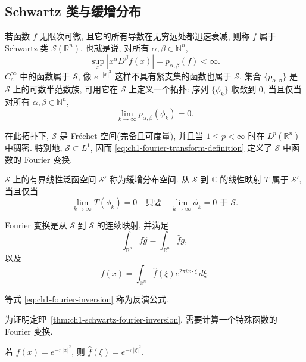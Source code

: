\subsection{Schwartz 类与缓增分布}
\label{sec:ch1-schwartz-tempered-distributions}

若函数 $f$ 无限次可微, 且它的所有导数在无穷远处都迅速衰减, 则称 $f$ 属于 Schwartz 类 $\mathcal S(\mathbb R^n)$. 也就是说, 对所有 $\alpha,\beta\in\mathbb N^n$,
\[
 \sup_x|x^\alpha D^\beta f(x)|=p_{\alpha,\beta}(f)<\infty.
\]
$C_c^\infty$ 中的函数属于 $\mathcal S$, 像 $e^{-|x|^2}$ 这样不具有紧支集的函数也属于 $\mathcal S$. 集合 $\{p_{\alpha,\beta}\}$ 是 $\mathcal S$ 上的可数半范数族, 可用它在 $\mathcal S$ 上定义一个拓扑: 序列 $\{\phi_k\}$ 收敛到 $0$, 当且仅当对所有 $\alpha,\beta\in\mathbb N^n$,
\[
 \lim_{k\to\infty}p_{\alpha,\beta}(\phi_k)=0.
\]

\hypertarget{chapter-01-page-025}{}
在此拓扑下, $\mathcal S$ 是 Fréchet 空间(完备且可度量), 并且当 $1\le p<\infty$ 时在 $L^p(\mathbb R^n)$ 中稠密. 特别地, $\mathcal S\subset L^1$, 因而 \eqref{eq:ch1-fourier-transform-definition} 定义了 $\mathcal S$ 中函数的 Fourier 变换.

$\mathcal S$ 上的有界线性泛函空间 $\mathcal S'$ 称为缓增分布空间. 从 $\mathcal S$ 到 $\mathbb C$ 的线性映射 $T$ 属于 $\mathcal S'$, 当且仅当
\[
 \lim_{k\to\infty}T(\phi_k)=0
 \quad\text{只要}\quad
 \lim_{k\to\infty}\phi_k=0\text{ 于 }\mathcal S.
\]

\begin{Theorem}
\label{thm:ch1-schwartz-fourier-inversion}
Fourier 变换是从 $\mathcal S$ 到 $\mathcal S$ 的连续映射, 并满足
\begin{equation}
\label{eq:ch1-fourier-pairing-symmetry}
 \int_{\mathbb R^n}f\widehat g=\int_{\mathbb R^n}\widehat f g,
\end{equation}
以及
\begin{equation}
\label{eq:ch1-fourier-inversion}
 f(x)=\int_{\mathbb R^n}\widehat f(\xi)e^{2\pi ix\cdot\xi}\,d\xi.
\end{equation}
\end{Theorem}

等式 \eqref{eq:ch1-fourier-inversion} 称为反演公式.

为证明定理~\ref{thm:ch1-schwartz-fourier-inversion}, 需要计算一个特殊函数的 Fourier 变换.

\begin{Lemma}
\label{lem:ch1-gaussian-fourier-transform}
若 $f(x)=e^{-\pi|x|^2}$, 则 $\widehat f(\xi)=e^{-\pi|\xi|^2}$.
\end{Lemma}

